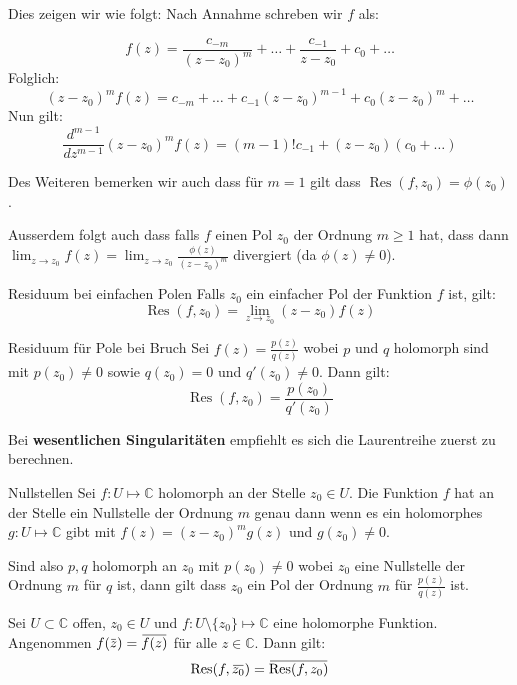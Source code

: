 \documentclass[a4paper,10pt]{article}
\DeclareMathOperator{\Res}{Res}
\def\C{\mathbb{C}}
\newcommand{\overbar}[1]{\mkern 1.5mu\overline{\mkern-1.5mu#1\mkern-1.5mu}\mkern 1.5mu}
\begin{document}
Dies zeigen wir wie folgt: Nach Annahme schreben wir $f$ als:

$$
  f(z) = \frac{c_{-m}}{(z - z_0)^m} + \ldots + \frac{c_{-1}}{z - z_0} + c_0 + \ldots
$$
Folglich:
$$
  (z - z_0)^m f(z) = c_{-m} + \ldots + c_{-1} (z - z_0)^{m-1} + c_0 (z - z_0)^m + \ldots
$$
Nun gilt:
$$
\frac{d^{m-1}}{dz^{m-1}} (z - z_0)^m f(z) = (m - 1)! c_{-1} + (z - z_0) (c_0 + \ldots)
$$

Des Weiteren bemerken wir auch dass für $m = 1$ gilt dass $\Res(f, z_0) = \phi(z_0)$.

Ausserdem folgt auch dass falls $f$ einen Pol $z_0$ der Ordnung $m \geq 1$ hat, dass dann $\lim_{z \to z_0} f(z) = \lim_{z \to z_0} \frac{\phi(z)}{(z - z_0)^m}$ divergiert (da $\phi(z) \neq 0$).

\begin{mainbox}{Residuum bei einfachen Polen}
  Falls $z_0$ ein einfacher Pol der Funktion $f$ ist, gilt:
  $$
    \Res(f, z_0) = \lim_{z \to z_0} (z - z_0) f(z)
  $$
\end{mainbox}

\begin{mainbox}{Residuum für Pole bei Bruch}
  Sei $f(z) = \frac{p(z)}{q(z)}$ wobei $p$ und $q$ holomorph sind mit $p(z_0) \neq 0$ sowie $q(z_0) = 0$ und $q'(z_0) \neq 0$. Dann gilt:
  $$
    \Res(f, z_0) = \frac{p(z_0)}{q'(z_0)}
  $$
\end{mainbox}

Bei \textbf{wesentlichen Singularitäten} empfiehlt es sich die Laurentreihe zuerst zu berechnen. 

\begin{subbox}{Nullstellen}
  Sei $f: U \mapsto \C$ holomorph an der Stelle $z_0 \in U$. Die Funktion $f$ hat an der Stelle ein Nullstelle der Ordnung $m$ genau dann wenn es ein holomorphes $g: U \mapsto \C$ gibt mit $f(z) = (z - z_0)^m g(z)$ und $g(z_0) \neq 0$. 
\end{subbox}

Sind also $p,q$ holomorph an $z_0$ mit $p(z_0) \neq 0$ wobei $z_0$ eine Nullstelle der Ordnung $m$ für $q$ ist, dann gilt dass $z_0$ ein Pol der Ordnung $m$ für $\frac{p(z)}{q(z)}$ ist.

\begin{subbox}{}
  Sei $U \subset \C$ offen, $z_0 \in U$ und $f: U \setminus \{z_0\} \mapsto \C$ eine holomorphe Funktion. Angenommen $f(\overbar{z}) = \overbar{f(z)}$ für alle $z \in \C$. Dann gilt:
  $$
    \Res(f, \overbar{z_0}) = \overbar{\Res(f, z_0)}
  $$
\end{subbox}
\end{document}
